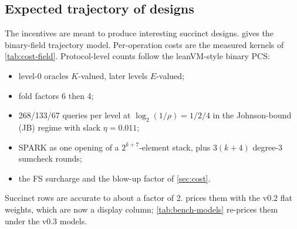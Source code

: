 \subsection{Expected trajectory of designs}\label{subsec:bench-trajectory}

The incentives are meant to produce interesting succinct designs.  gives
the binary-field trajectory model. Per-operation costs are the measured kernels of
\cref{tab:cost-field}. Protocol-level counts follow the leanVM-style binary PCS:
\begin{itemize}[nosep]
\item level-0 oracles $K$-valued, later levels $E$-valued;
\item fold factors 6 then 4;
\item 268/133/67 queries per level at $\log_2(1/\rho)=1/2/4$ in the Johnson-bound (JB) regime with
  slack $\eta=0.011$;
\item SPARK as one opening of a $2^{k+7}$-element stack, plus $3(k+4)$ degree-3 sumcheck rounds;
\item the FS surcharge and the blow-up factor of \cref{sec:cost}.
\end{itemize}
Succinct rows are accurate to about a factor of 2.  prices them with the
v0.2 flat weights, which are now a display column; \cref{tab:bench-models} re-prices them under the
v0.3 models.

